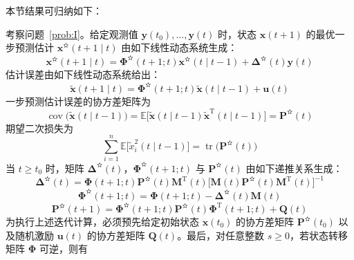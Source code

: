 本节结果可归纳如下：

\begin{theorem}[线性最优估计问题的解]\label{thm:3}

考察问题~\ref{prob:I}。给定观测值 $\bm{y}(t_0), \dots, \bm{y}(t)$ 时，状态 $\bm{x}(t + 1)$ 的最优一步预测估计 $\bm{x}^{\text{✫}}(t + 1 \mid t)$ 由如下线性动态系统生成：
\begin{equation*}
\bm{x}^{\text{✫}}(t + 1 \mid t) = \bm{\Phi}^{\text{✫}}(t + 1; t)\bm{x}^{\text{✫}}(t \mid t - 1) + \bm{\Delta}^{\text{✫}}(t)\bm{y}(t) \tag{21}
\end{equation*}
估计误差由如下线性动态系统给出：
\begin{equation*}
\tilde{\bm{x}}(t + 1 \mid t) = \bm{\Phi}^{\text{✫}}(t + 1; t)\tilde{\bm{x}}(t \mid t - 1) + \bm{u}(t) \tag{23}
\end{equation*}
一步预测估计误差的协方差矩阵为
\begin{equation}\label{eq:26}
\operatorname{cov}\bigl(\tilde{\bm{x}}(t \mid t - 1)\bigr) = \mathbb{E}\bigl[\tilde{\bm{x}}(t \mid t - 1)\tilde{\bm{x}}^{\mathrm{T}}(t \mid t - 1)\bigr] = \bm{P}^{\text{✫}}(t)
\end{equation}
期望二次损失为
\begin{equation}\label{eq:27}
\sum_{i=1}^{n} \mathbb{E}\bigl[\tilde{x}_i^2(t \mid t - 1)\bigr] = \operatorname{tr}\bigl(\bm{P}^{\text{✫}}(t)\bigr)
\end{equation}
当 $t \geq t_0$ 时，矩阵 $\bm{\Delta}^{\text{✫}}(t)$，$\bm{\Phi}^{\text{✫}}(t + 1; t)$ 与 $\bm{P}^{\text{✫}}(t)$ 由如下递推关系生成：
\begin{equation}\label{eq:28}
\bm{\Delta}^{\text{✫}}(t) = \bm{\Phi}(t + 1; t)\bm{P}^{\text{✫}}(t)\bm{M}^{\mathrm{T}}(t)\bigl[\bm{M}(t)\bm{P}^{\text{✫}}(t)\bm{M}^{\mathrm{T}}(t)\bigr]^{-1}
\end{equation}
\begin{equation}\label{eq:29}
\bm{\Phi}^{\text{✫}}(t + 1; t) = \bm{\Phi}(t + 1; t) - \bm{\Delta}^{\text{✫}}(t)\bm{M}(t)
\end{equation}
\begin{equation}\label{eq:30}
\bm{P}^{\text{✫}}(t + 1) = \bm{\Phi}^{\text{✫}}(t + 1; t)\bm{P}^{\text{✫}}(t)\bm{\Phi}^{\mathrm{T}}(t + 1; t) + \bm{Q}(t)
\end{equation}
为执行上述迭代计算，必须预先给定初始状态 $\bm{x}(t_0)$ 的协方差矩阵 $\bm{P}^{\text{✫}}(t_0)$ 以及随机激励 $\bm{u}(t)$ 的协方差矩阵 $\bm{Q}(t)$。最后，对任意整数 $s \geq 0$，若状态转移矩阵 $\bm{\Phi}$ 可逆，则有
\begin{equation}\label{eq:31}

\end{equation}
\end{theorem}
